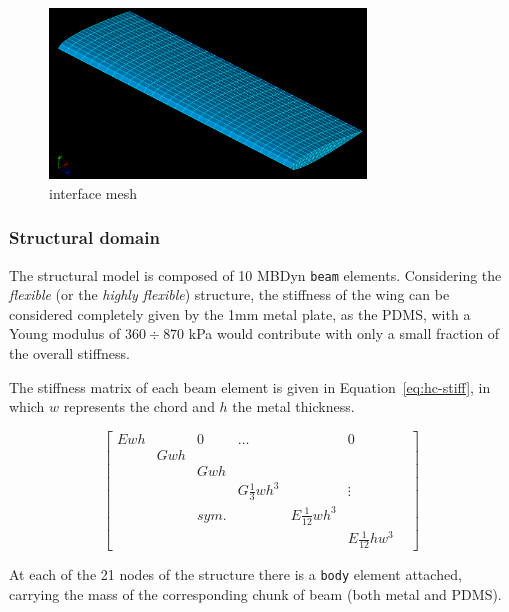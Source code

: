 \begin{figure}[htbp!]
	\centering
	\includegraphics[width=0.75\textwidth]{images/heathcote/interface01.png}
	\caption{interface mesh}
	\label{fig:hc-interface}
\end{figure}


\subsubsection{Structural domain}

The structural model is composed of 10 MBDyn \texttt{beam} elements. Considering the \textit{flexible} (or the \textit{highly flexible}) structure, the stiffness of the wing can be considered completely given by the 1\si{mm} metal plate, as the PDMS, with a Young modulus of $360\div870$ \si{kPa} would contribute with only a small fraction of the overall stiffness.

The stiffness matrix of each beam element is given in Equation~\ref{eq:hc-stiff}, in which $w$ represents the chord and $h$ the metal thickness.

\begin{equation}
    \begin{bmatrix} Ewh &  & 0 & \ldots &  & 0 \\
                          & Gwh &  & & & &  \\
                          & & Gwh & & & \\
                          & & & G\frac{1}{3}wh^3 & & \vdots \\
                          & &  sym. & & E\frac{1}{12}wh^3 &  \\
                          & & & & & E\frac{1}{12}hw^3
    \end{bmatrix} 
    \label{eq:hc-stiff}
\end{equation}

At each of the 21 nodes of the structure there is a \texttt{body} element attached, carrying the mass of the corresponding chunk of beam (both metal and PDMS).

